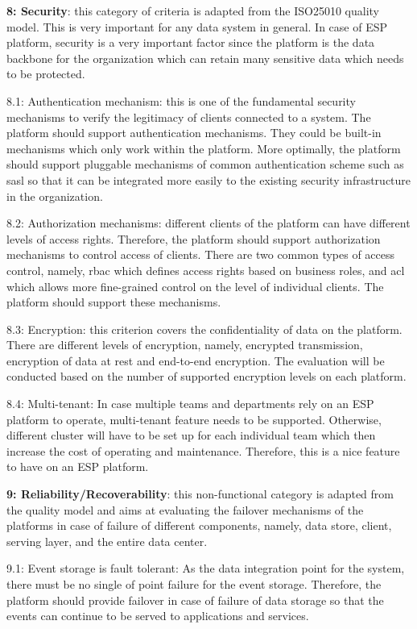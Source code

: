 \textbf{8: Security}: this category of criteria is adapted from the ISO25010 quality model. This is very important for any data system in general. In case of ESP platform, security is a very important factor since the platform is the data backbone for the organization which can retain many sensitive data which needs to be protected.

8.1: Authentication mechanism: this is one of the fundamental security mechanisms to verify the legitimacy of clients connected to a system. The platform should support authentication mechanisms. They could be built-in mechanisms which only work within the platform. More optimally, the platform should support pluggable mechanisms of common authentication scheme such as \acrfull{sasl} so that it can be integrated more easily to the existing security infrastructure in the organization.

8.2: Authorization mechanisms: different clients of the platform can have different levels of access rights. Therefore, the platform should support authorization mechanisms to control access of clients. There are two common types of access control, namely, \acrfull{rbac} which defines access rights based on business roles, and \acrfull{acl} which allows more fine-grained control on the level of individual clients. The platform should support these mechanisms.

8.3: Encryption: this criterion covers the confidentiality of data on the platform. There are different levels of encryption, namely, encrypted transmission, encryption of data at rest and end-to-end encryption. The evaluation will be conducted based on the number of supported encryption levels on each platform.

8.4: Multi-tenant: In case multiple teams and departments rely on an ESP platform to operate, multi-tenant feature needs to be supported. Otherwise, different cluster will have to be set up for each individual team which then increase the cost of operating and maintenance. Therefore, this is a nice feature to have on an ESP platform.

\textbf{9: Reliability/Recoverability}: this non-functional category is adapted from the quality model and aims at evaluating the failover mechanisms of the platforms in case of failure of different components, namely, data store, client, serving layer, and the entire data center.

9.1: Event storage is fault tolerant: As the data integration point for the system, there must be no single of point failure for the event storage. Therefore, the platform should provide failover in case of failure of data storage so that the events can continue to be served to applications and services.


